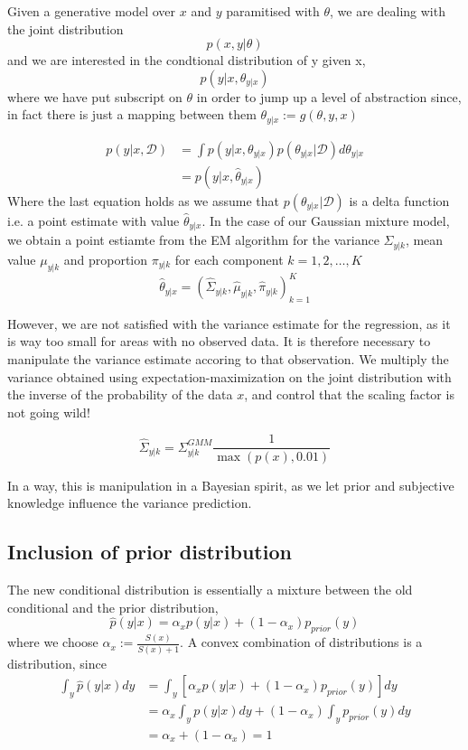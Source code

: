 Given a generative model over $x$ and $y$ paramitised with $\theta$, we are dealing with the joint distribution
$$p(x,y|\theta)$$
and we are interested in the condtional distribution of y given x, 
$$p(y|x, \theta_{y|x})$$
where we have put subscript on $\theta$ in order to jump up a level of abstraction since, 
in fact there is just a mapping between them $\theta_{y|x} := g(\theta, y, x)$ 




\begin{align*}
    p(y|x, \mathcal{D}) &= \int p(y|x,\theta_{y|x})p(\theta_{y|x}|\mathcal{D}) d\theta_{y|x}  \\
    &=  p(y|x,\hat \theta_{y|x})
\end{align*}
Where the last equation holds as we assume that $p(\theta_{y|x}|\mathcal{D})$ is a delta function
i.e. a point estimate with value $\hat \theta_{y|x}$. In the case of our Gaussian mixture model, 
we obtain a point estiamte from the EM algorithm for the variance $\Sigma_{y|k}$, mean value $\mu_{y|k}$ and proportion $\pi_{y|k}$
for each component $k = 1,2, \dots, K$
$$\hat \theta_{y|x} = (\hat\Sigma_{y|k}, \hat\mu_{y|k}, \hat\pi_{y|k})_{k=1}^K$$

However, we are not satisfied with the variance estimate for the regression, as it is way too small for areas with
no observed data. It is therefore necessary to manipulate the variance estimate accoring to that observation. 
We multiply the variance obtained using expectation-maximization on the joint distribution with the 
inverse of the probability of the data $x$, and control that the scaling factor is not going wild!

$$\hat\Sigma_{y|k} =\Sigma_{y|k}^{GMM} \frac{1}{\max(p(x), 0.01)}$$

In a way, this is manipulation in a Bayesian spirit, as we let prior and subjective knowledge influence the
variance prediction. 
\subsection{Inclusion of prior distribution}
The new conditional distribution is essentially a mixture between the old conditional and the prior distribution, 
$$\hat p(y|x) = \alpha_x p(y|x) + (1-\alpha_x)p_{prior}(y)$$
where we choose $\alpha_x := \frac{S(x)}{S(x)+1}$. A convex combination of distributions is a distribution, 
since 
\begin{align*}
    \int_y \hat p(y|x) dy &= \int_y \left[ \alpha_x p(y|x) + (1-\alpha_x)p_{prior}(y) \right] dy\\
     &= \alpha_x \int_y p(y|x)dy +(1-\alpha_x) \int_y p_{prior}(y)dy \\
     &= \alpha_x + (1-\alpha_x) = 1
\end{align*}
    
